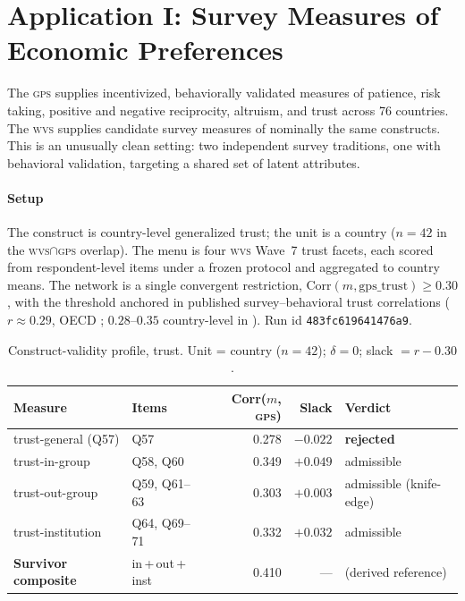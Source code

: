 \documentclass[11pt,letterpaper]{article}
\newcommand{\GPS}{\textsc{gps}}
\newcommand{\WVS}{\textsc{wvs}}
\begin{document}
\section{Application I: Survey Measures of Economic Preferences}
\label{sec:survey}

The \GPS{} \cite{falk2018} supplies incentivized, behaviorally validated measures of patience, risk taking,
positive and negative reciprocity, altruism, and trust across 76 countries. The \WVS{} supplies candidate
survey measures of nominally the same constructs. This is an unusually clean setting: two independent survey
traditions, one with behavioral validation, targeting a shared set of latent attributes.

\paragraph{Setup} The construct is country-level generalized trust; the unit is a country ($n=42$ in the
\WVS{}$\cap$\GPS{} overlap). The menu is four \WVS{} Wave~7 trust facets, each scored from respondent-level
items under a frozen protocol and aggregated to country means. The network is a single convergent
restriction, $\mathrm{Corr}(m, \mathrm{gps\_trust}) \ge 0.30$, with the threshold anchored in published
survey--behavioral trust correlations ($r \approx 0.29$, OECD \cite{oecd2017}; $0.28$--$0.35$ country-level in
\cite{falk2018}). Run id \texttt{483fc619641476a9}.

\begin{table}[h!]
\centering
\caption{Construct-validity profile, trust. Unit = country ($n=42$); $\delta=0$; slack $= r - 0.30$.}
\label{tab:trust}
\small
\begin{tabular}{@{}llrrl@{}}
\toprule
\textbf{Measure} & \textbf{Items} & \textbf{Corr($m$, \GPS{})} & \textbf{Slack} & \textbf{Verdict} \\
\midrule
trust-general (Q57)  & Q57          & 0.278 & $-0.022$ & \textbf{rejected} \\
trust-in-group       & Q58, Q60     & 0.349 & $+0.049$ & admissible \\
trust-out-group      & Q59, Q61--63 & 0.303 & $+0.003$ & admissible (knife-edge) \\
trust-institution    & Q64, Q69--71 & 0.332 & $+0.032$ & admissible \\
\midrule
\textbf{Survivor composite} & in\,+\,out\,+\,inst & 0.410 & --- & (derived reference) \\
\bottomrule
\end{tabular}
\end{table}
\end{document}
